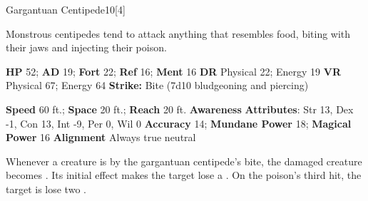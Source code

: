   
  \begin{monsection}{Gargantuan Centipede}{10}[4]
    \vspace{-1em}\vspace{-1em}
    \vspace{0em}

    
    Monstrous centipedes tend to attack anything that resembles food, biting with their jaws and injecting their poison.
  
    

    \begin{spellcontent}
      \begin{spelltargetinginfo}
        \pari \textbf{HP} 52;
          \textbf{AD} 19;
          \textbf{Fort} 22;
          \textbf{Ref} 16;
          \textbf{Ment} 16
        \pari \textbf{DR} Physical 22; Energy 19
        \pari \textbf{VR} Physical 67; Energy 64
        \pari \textbf{Strike:}
            Bite  (7d10 bludgeoning and piercing)
      \end{spelltargetinginfo}
    \end{spellcontent}
    \begin{monsterfooter}
      \pari \textbf{Speed} 60 ft.;
        \textbf{Space} 20 ft.;
        \textbf{Reach} 20 ft.
      \pari \textbf{Awareness} 
      \pari \textbf{Attributes}:
        Str 13, Dex -1,
        Con 13, Int -9,
        Per 0, Wil 0
      \pari \textbf{Accuracy} 14;
        \textbf{Mundane Power} 18;
      \textbf{Magical Power} 16
      \pari \textbf{Alignment} Always true neutral
    \end{monsterfooter}
  \end{monsection}
    Whenever a creature is  by the gargantuan centipede's bite,
      the damaged creature becomes .
    Its initial effect makes the target lose a .
    On the poison's third hit, the target is lose two .
  
